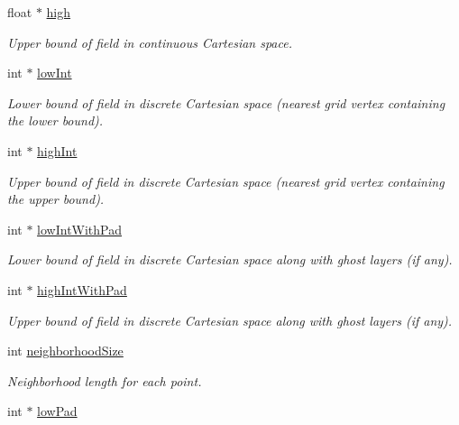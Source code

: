 \begin{DoxyCompactItemize}
float $\ast$ \hyperlink{classITL__grid_a14b5be78196bb74d85cf3751a2b32b47}{high}
\begin{DoxyCompactList}\small\item\em Upper bound of field in continuous Cartesian space. \item\end{DoxyCompactList}\item 
int $\ast$ \hyperlink{classITL__grid_a3780830b49b613a702233bf4b9ccc467}{lowInt}
\begin{DoxyCompactList}\small\item\em Lower bound of field in discrete Cartesian space (nearest grid vertex containing the lower bound). \item\end{DoxyCompactList}\item 
int $\ast$ \hyperlink{classITL__grid_a60b5b9c9b8586ed362a09ba46dc6a158}{highInt}
\begin{DoxyCompactList}\small\item\em Upper bound of field in discrete Cartesian space (nearest grid vertex containing the upper bound). \item\end{DoxyCompactList}\item 
int $\ast$ \hyperlink{classITL__grid_a14f44c2a00f16d0c35a2cfbb72f61423}{lowIntWithPad}
\begin{DoxyCompactList}\small\item\em Lower bound of field in discrete Cartesian space along with ghost layers (if any). \item\end{DoxyCompactList}\item 
int $\ast$ \hyperlink{classITL__grid_ab9793b1da79d6926cc0d739f3da266c0}{highIntWithPad}
\begin{DoxyCompactList}\small\item\em Upper bound of field in discrete Cartesian space along with ghost layers (if any). \item\end{DoxyCompactList}\item 
int \hyperlink{classITL__grid_ace636892759ad4345c5f7725506ab329}{neighborhoodSize}
\begin{DoxyCompactList}\small\item\em Neighborhood length for each point. \item\end{DoxyCompactList}\item 
int $\ast$ \hyperlink{classITL__grid_a1d7b33b487dbe224fa10f11a23ee9f26}{lowPad}

\end{DoxyCompactItemize}
